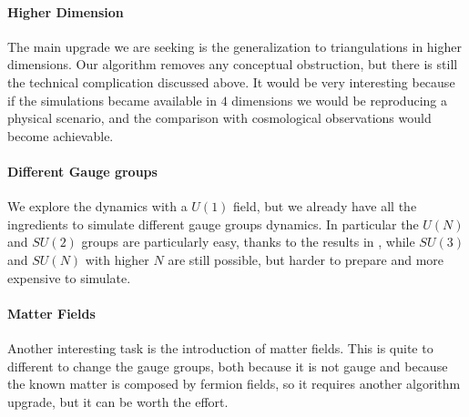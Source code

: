 \paragraph{Higher Dimension} The main upgrade we are seeking is the generalization to triangulations in higher dimensions. Our algorithm removes any conceptual obstruction, but there is still the technical complication discussed above.
It would be very interesting because if the simulations became available in $ 4 $ dimensions we would be reproducing a physical scenario, and the comparison with cosmological observations would become achievable.

\paragraph{Different Gauge groups} We explore the dynamics with a $ U(1) $ field, but we already have all the ingredients to simulate different gauge groups dynamics. In particular the $ U(N) $ and $ SU(2) $ groups are particularly easy, thanks to the results in \cite{Brower1981, Brower1981a}, while $ SU(3) $ and $ SU(N) $ with higher $ N $ are still possible, but harder to prepare and more expensive to simulate.

\paragraph{Matter Fields} Another interesting task is the introduction of matter fields. This is quite to different to change the gauge groups, both because it is not gauge and because the known matter is composed by fermion fields, so it requires another algorithm upgrade, but it can be worth the effort.

\vfill
